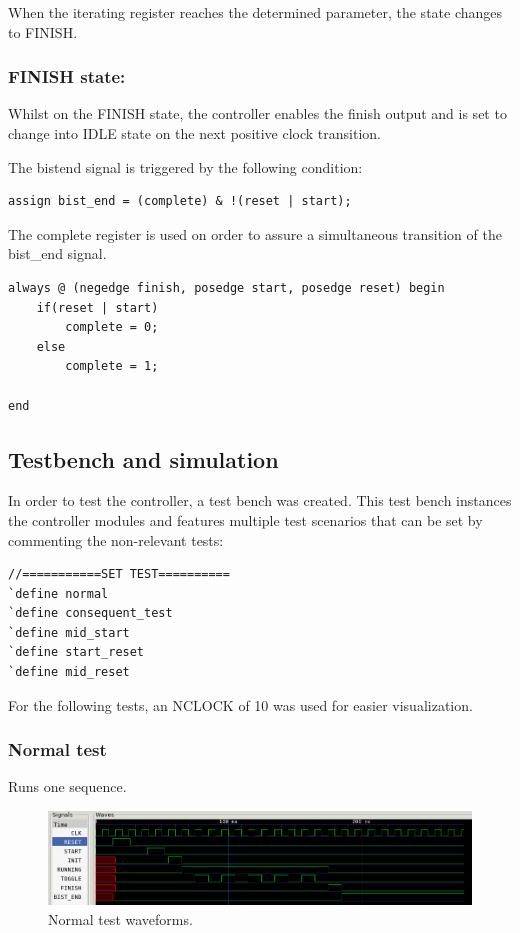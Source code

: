 \documentclass[12pt]{article}
\begin{document}
    When the iterating register reaches the determined parameter, the state changes to FINISH.
    
    \subsubsection*{FINISH state:}
    Whilst on the FINISH state, the controller enables the finish output and is set to change into IDLE state on the next positive clock transition.
    
    The bist\textunderscore end signal is triggered by the following condition:
    \begin{lstlisting}[caption={bist\textunderscore end register drive.},captionpos=b]
assign bist_end = (complete) & !(reset | start);
    \end{lstlisting}
    

    The complete register is used on order to assure a simultaneous transition of the bist\_end signal. 
    \begin{lstlisting}[caption={Complete register drive.},captionpos=b]
always @ (negedge finish, posedge start, posedge reset) begin
	if(reset | start)
		complete = 0;
	else
		complete = 1;
	
end
\end{lstlisting}
	
	\subsection{Testbench and simulation}
	
	In order to test the controller, a test bench was created. This test bench instances the controller modules and features multiple test scenarios that can be set by commenting the non-relevant tests:
    \begin{lstlisting}[caption={Testbench test set.},captionpos=b]
//===========SET TEST==========
`define normal
`define consequent_test
`define mid_start
`define start_reset
`define mid_reset
    \end{lstlisting}
    
    
    For the following tests, an NCLOCK of 10 was used for easier visualization.
	
	\subsubsection*{Normal test}
	Runs one sequence.
	\begin{figure}[H]
        \centering
        \includegraphics[scale=0.6]{normal_test.png}
            \caption{Normal test waveforms.}
            \label{fig:normal_test}
    \end{figure}
	
\end{document}
